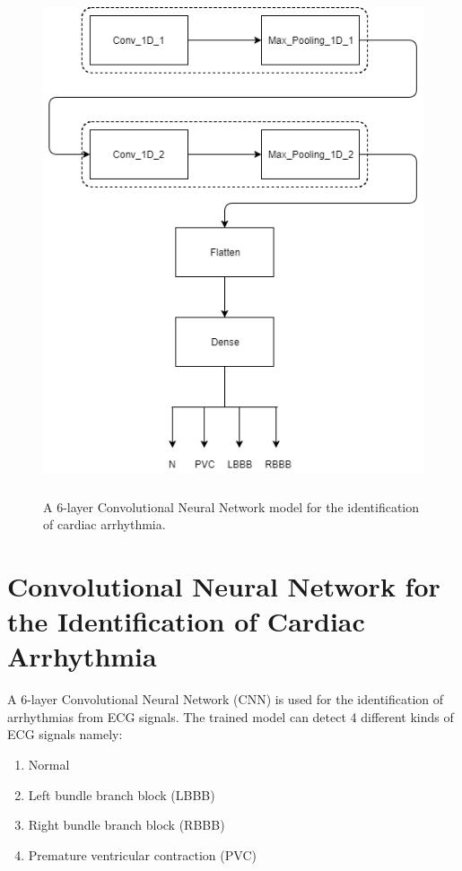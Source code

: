 \begin{figure}[htpb]
	\centering
	\includegraphics[width=20cm,height=15cm,keepaspectratio=true]{images/cnn_model}
	\caption{
		A 6-layer Convolutional Neural Network model for the identification of cardiac arrhythmia.
	}
	\label{fig:cnn_model}
\end{figure}


\section{Convolutional Neural Network for the Identification of Cardiac Arrhythmia}
A 6-layer Convolutional Neural Network (CNN) is used for the identification of arrhythmias from ECG signals. The trained model can detect 4 different kinds of ECG signals namely:

\begin{enumerate}
	\item Normal
	\item Left bundle branch block (LBBB)
	\item Right bundle branch block (RBBB)
	\item Premature ventricular contraction (PVC)
\end{enumerate}

